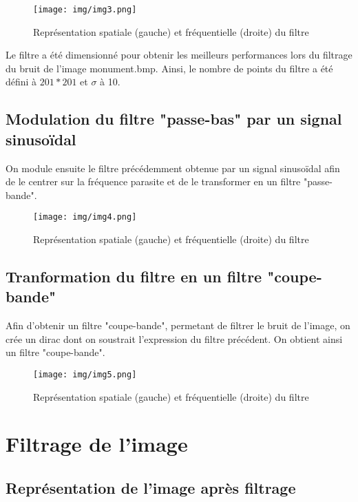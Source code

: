\documentclass[11pt]{article}
\begin{document}
		\begin{figure}[h]
			\centering
			\texttt{[image: img/img3.png]}
			\caption{Représentation spatiale (gauche) et fréquentielle (droite) du filtre}
			\label{img3}
		\end{figure}

	Le filtre a été dimensionné pour obtenir les meilleurs performances lors du filtrage du bruit de l'image monument.bmp. Ainsi, le nombre de points du filtre a été défini à $201*201$ et $\sigma$ à 10.
	
	\subsection{Modulation du filtre "passe-bas" par un signal sinusoïdal}
	
	On module ensuite le filtre précédemment obtenue par un signal sinusoïdal afin de le centrer sur la fréquence parasite et de le transformer en un filtre "passe-bande".
	
		\begin{figure}[H]
			\centering
			\texttt{[image: img/img4.png]}
			\caption{Représentation spatiale (gauche) et fréquentielle (droite) du filtre}
			\label{img4}
		\end{figure}

\subsection{Tranformation du filtre en un filtre "coupe-bande"}

	Afin d'obtenir un filtre "coupe-bande", permetant de filtrer le bruit de l'image, on crée un dirac dont on soustrait l'expression du filtre précédent. On obtient ainsi un filtre "coupe-bande".

		\begin{figure}[h]
			\centering
			\texttt{[image: img/img5.png]}
			\caption{Représentation spatiale (gauche) et fréquentielle (droite) du filtre}
			\label{img5}
		\end{figure}	

\section{Filtrage de l'image}
	
	\subsection{Représentation de l'image après filtrage}
	
\end{document}
